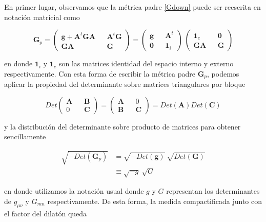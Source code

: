 \documentclass{article}
\numberwithin{equation}{section}
\begin{document}
En primer lugar, observamos que la métrica padre \ref{Gdown} puede ser reescrita en notación matricial como 

\begin{equation}
\bm{G}_p=
\begin{pmatrix}
\bm{g} + \bm{A}^t \bm{G} \bm{A} && \bm{A}^t \bm{G}\\
\bm{G A}  && \bm{G}
\end{pmatrix}
=
\begin{pmatrix}
\bm{g} && \bm{A}^t\\
\bm{0} && \bm{1}_i
\end{pmatrix} \ 
\begin{pmatrix}
\bm{1}_e && \bm{0}\\
\bm{G A}  && \bm{G}
\end{pmatrix}
\end{equation}

en donde $ \bm{1}_i $ y $ \bm{1}_e $ son las matrices identidad del espacio interno y externo respectivamente. Con esta forma de escribir la métrica padre $ \bm{G}_p $, podemos aplicar la propiedad del determinante sobre matrices triangulares por bloque

\begin{equation}
Det 
\begin{pmatrix}
\bm{A} && \bm{B}\\
0  && \bm{C}
\end{pmatrix}
=
\begin{pmatrix}
\bm{A} && 0\\
\bm{B}  && \bm{C}
\end{pmatrix}
=
Det\left(\bm{A}\right) Det\left(\bm{C}\right)
\end{equation}

y la distribución del determinante sobre producto de matrices para obtener sencillamente

\begin{equation}
\begin{aligned}
\sqrt{-Det\left( \bm{G}_p\right)} &= \sqrt{-Det\left( \bm{g}\right)} \ \sqrt{Det\left( \bm{G}\right)}\\
& \equiv \sqrt{-g} \ \sqrt{G} 
\end{aligned}
\end{equation}

en donde utilizamos la notación usual donde $ g $ y $ G $ representan los determinantes de $ g_{\mu \nu} $ y $ G_{m n} $ respectivamente. De esta forma, la medida compactificada junto con el factor del dilatón queda
\end{document}
